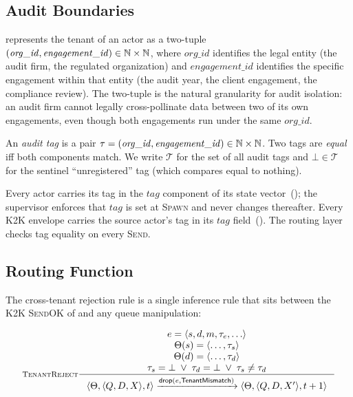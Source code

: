 \subsection{Audit Boundaries}
\label{sec:tenancy:boundaries}

\system{} represents the tenant of an actor as a two-tuple
\((\mathit{org\_id}, \mathit{engagement\_id}) \in \mathbb{N} \times \mathbb{N}\),
where \(\mathit{org\_id}\) identifies the legal entity (the audit
firm, the regulated organization) and \(\mathit{engagement\_id}\)
identifies the specific engagement within that entity (the audit
year, the client engagement, the compliance review).  The two-tuple
is the natural granularity for audit isolation: an audit firm
cannot legally cross-pollinate data between two of its own
engagements, even though both engagements run under the same
\(\mathit{org\_id}\).

\begin{definition}
\label{def:audit-tag}
An \emph{audit tag} is a pair \(\tau = (\mathit{org\_id},
\mathit{engagement\_id}) \in \mathbb{N} \times \mathbb{N}\).  Two tags are
\emph{equal} iff both components match.  We write \(\mathcal{T}\)
for the set of all audit tags and \(\bot \in \mathcal{T}\) for the
sentinel ``unregistered'' tag (which compares equal to nothing).
\end{definition}

Every actor carries its tag in the \(\mathit{tag}\) component of its
state vector~(); the supervisor enforces that
\(\mathit{tag}\) is set at \textsc{Spawn} and never changes thereafter.
Every K2K envelope carries the source actor's tag in its
\(\mathit{tag}\) field~().  The routing layer
checks tag equality on every \textsc{Send}.

\subsection{Routing Function}
\label{sec:tenancy:routing}

The cross-tenant rejection rule is a single inference rule that
sits between the K2K \textsc{SendOK} of  and any
queue manipulation:

\begin{equation}
\inference[\textsc{TenantReject}]
{
  e = \langle s, d, m, \tau_e, \ldots\rangle \\
  \Theta(s) = \langle \ldots, \tau_s\rangle \\
  \Theta(d) = \langle \ldots, \tau_d\rangle \\
  \tau_s = \bot \;\lor\; \tau_d = \bot \;\lor\; \tau_s \neq \tau_d
}
{
  \langle \Theta, \langle Q, D, X\rangle, t\rangle
  \trans{\mathsf{drop}(e, \state{TenantMismatch})}
  \langle \Theta, \langle Q, D, X'\rangle, t+1\rangle
}
\label{rule:tenant-reject}
\end{equation}

